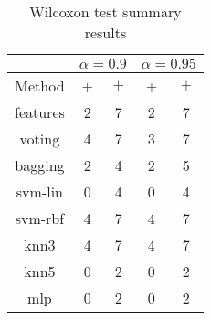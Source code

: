 \documentclass[a4paper,10pt]{article}
\begin{document}
\begin{sidewaystable}[!htp]
\centering\scriptsize
{}
\caption{Summary of the Wilcoxon test. \textbullet = the method in the row improves the method of the column. \textopenbullet = the method in the column improves the method of the row. Upper diagonal of level significance $\alpha=0.9$,Lower diagonal level of significance $\alpha=0.95$}

\end{sidewaystable}

 \clearpage 


\begin{table}[!htp]
\centering\scriptsize
\begin{tabular}{
|c|c|c|c|c|}
\hline
&\multicolumn{2}{c|}{$\alpha=0.9$} & \multicolumn{2}{c|}{$\alpha=0.95$}\\\hline
Method & + & $\pm$ & + & $\pm$ \\
\hline
features & 2 & 7 & 2 & 7\\
\hline
voting & 4 & 7 & 3 & 7\\
\hline
bagging & 2 & 4 & 2 & 5\\
\hline
svm-lin & 0 & 4 & 0 & 4\\
\hline
svm-rbf & 4 & 7 & 4 & 7\\
\hline
knn3 & 4 & 7 & 4 & 7\\
\hline
knn5 & 0 & 2 & 0 & 2\\
\hline
mlp & 0 & 2 & 0 & 2\\
\hline

\end{tabular}
\caption{Wilcoxon test summary results}

\end{table}

 \clearpage 
\end{document}
